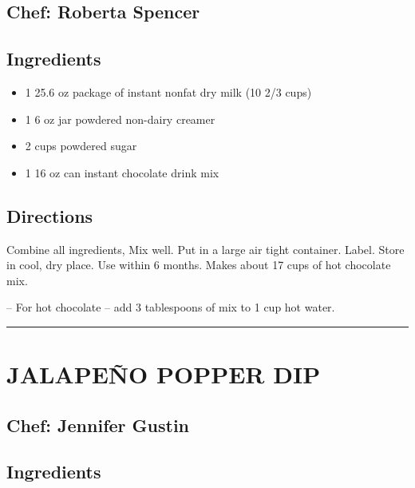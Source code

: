 \documentclass[
]{book}
\providecommand{\tightlist}{%
  \setlength{\itemsep}{0pt}\setlength{\parskip}{0pt}}
\begin{document}
\hypertarget{chef-roberta-spencer}{%
\subsection*{Chef: Roberta Spencer}\label{chef-roberta-spencer}}


\hypertarget{ingredients-7}{%
\subsection*{Ingredients}\label{ingredients-7}}


\begin{itemize}
\tightlist
\item
  1 25.6 oz package of instant nonfat dry milk (10 2/3 cups)
\item
  1 6 oz jar powdered non-dairy creamer
\item
  2 cups powdered sugar
\item
  1 16 oz can instant chocolate drink mix
\end{itemize}

\hypertarget{directions-7}{%
\subsection*{Directions}\label{directions-7}}


Combine all ingredients, Mix well. Put in a large air tight container. Label. Store in cool, dry place. Use within 6 months. Makes about 17 cups of hot chocolate mix.

-- For hot chocolate -- add 3 tablespoons of mix to 1 cup hot water.

\begin{center}\rule{0.5\linewidth}{0.5pt}\end{center}

\hypertarget{jalapeuxf1o-popper-dip}{%
\section*{JALAPEÑO POPPER DIP}\label{jalapeuxf1o-popper-dip}}


\hypertarget{chef-jennifer-gustin-2}{%
\subsection*{Chef: Jennifer Gustin}\label{chef-jennifer-gustin-2}}


\hypertarget{ingredients-8}{%
\subsection*{Ingredients}\label{ingredients-8}}
\end{document}
